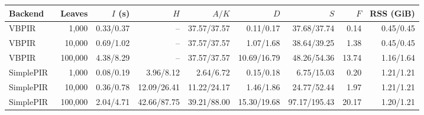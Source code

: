\begin{tabular}{lr r r r r r r r}
\toprule
Backend & Leaves & $I$ (s) & $H$ & $A/K$ & $D$ & $S$ & $F$ & RSS (GiB)\\
\midrule
VBPIR~\cite{vectorbatchpir} & 1,000 & 0.33/0.37 & -- & 37.57/37.57 & 0.11/0.17 & 37.68/37.74 & 0.14 & 0.45/0.45 \\
VBPIR~\cite{vectorbatchpir} & 10,000 & 0.69/1.02 & -- & 37.57/37.57 & 1.07/1.68 & 38.64/39.25 & 1.38 & 0.45/0.45 \\
VBPIR~\cite{vectorbatchpir} & 100,000 & 4.38/8.29 & -- & 37.57/37.57 & 10.69/16.79 & 48.26/54.36 & 13.74 & 1.16/1.64 \\
\midrule
SimplePIR~\cite{simplepir} & 1,000 & 0.08/0.19 & 3.96/8.12 & 2.64/6.72 & 0.15/0.18 & 6.75/15.03 & 0.20 & 1.21/1.21 \\
SimplePIR~\cite{simplepir} & 10,000 & 0.36/0.78 & 12.09/26.41 & 11.22/24.17 & 1.46/1.86 & 24.77/52.44 & 1.97 & 1.21/1.21 \\
SimplePIR~\cite{simplepir} & 100,000 & 2.04/4.71 & 42.66/87.75 & 39.21/88.00 & 15.30/19.68 & 97.17/195.43 & 20.17 & 1.20/1.21 \\
\bottomrule
\end{tabular}

